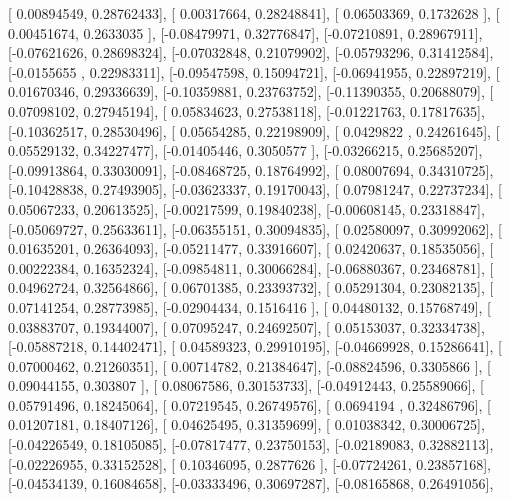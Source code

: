 \documentclass{article}
\begin{document}
       [ 0.00894549,  0.28762433],
       [ 0.00317664,  0.28248841],
       [ 0.06503369,  0.1732628 ],
       [ 0.00451674,  0.2633035 ],
       [-0.08479971,  0.32776847],
       [-0.07210891,  0.28967911],
       [-0.07621626,  0.28698324],
       [-0.07032848,  0.21079902],
       [-0.05793296,  0.31412584],
       [-0.0155655 ,  0.22983311],
       [-0.09547598,  0.15094721],
       [-0.06941955,  0.22897219],
       [ 0.01670346,  0.29336639],
       [-0.10359881,  0.23763752],
       [-0.11390355,  0.20688079],
       [ 0.07098102,  0.27945194],
       [ 0.05834623,  0.27538118],
       [-0.01221763,  0.17817635],
       [-0.10362517,  0.28530496],
       [ 0.05654285,  0.22198909],
       [ 0.0429822 ,  0.24261645],
       [ 0.05529132,  0.34227477],
       [-0.01405446,  0.3050577 ],
       [-0.03266215,  0.25685207],
       [-0.09913864,  0.33030091],
       [-0.08468725,  0.18764992],
       [ 0.08007694,  0.34310725],
       [-0.10428838,  0.27493905],
       [-0.03623337,  0.19170043],
       [ 0.07981247,  0.22737234],
       [ 0.05067233,  0.20613525],
       [-0.00217599,  0.19840238],
       [-0.00608145,  0.23318847],
       [-0.05069727,  0.25633611],
       [-0.06355151,  0.30094835],
       [ 0.02580097,  0.30992062],
       [ 0.01635201,  0.26364093],
       [-0.05211477,  0.33916607],
       [ 0.02420637,  0.18535056],
       [ 0.00222384,  0.16352324],
       [-0.09854811,  0.30066284],
       [-0.06880367,  0.23468781],
       [ 0.04962724,  0.32564866],
       [ 0.06701385,  0.23393732],
       [ 0.05291304,  0.23082135],
       [ 0.07141254,  0.28773985],
       [-0.02904434,  0.1516416 ],
       [ 0.04480132,  0.15768749],
       [ 0.03883707,  0.19344007],
       [ 0.07095247,  0.24692507],
       [ 0.05153037,  0.32334738],
       [-0.05887218,  0.14402471],
       [ 0.04589323,  0.29910195],
       [-0.04669928,  0.15286641],
       [ 0.07000462,  0.21260351],
       [ 0.00714782,  0.21384647],
       [-0.08824596,  0.3305866 ],
       [ 0.09044155,  0.303807  ],
       [ 0.08067586,  0.30153733],
       [-0.04912443,  0.25589066],
       [ 0.05791496,  0.18245064],
       [ 0.07219545,  0.26749576],
       [ 0.0694194 ,  0.32486796],
       [ 0.01207181,  0.18407126],
       [ 0.04625495,  0.31359699],
       [ 0.01038342,  0.30006725],
       [-0.04226549,  0.18105085],
       [-0.07817477,  0.23750153],
       [-0.02189083,  0.32882113],
       [-0.02226955,  0.33152528],
       [ 0.10346095,  0.2877626 ],
       [-0.07724261,  0.23857168],
       [-0.04534139,  0.16084658],
       [-0.03333496,  0.30697287],
       [-0.08165868,  0.26491056],
\end{document}
